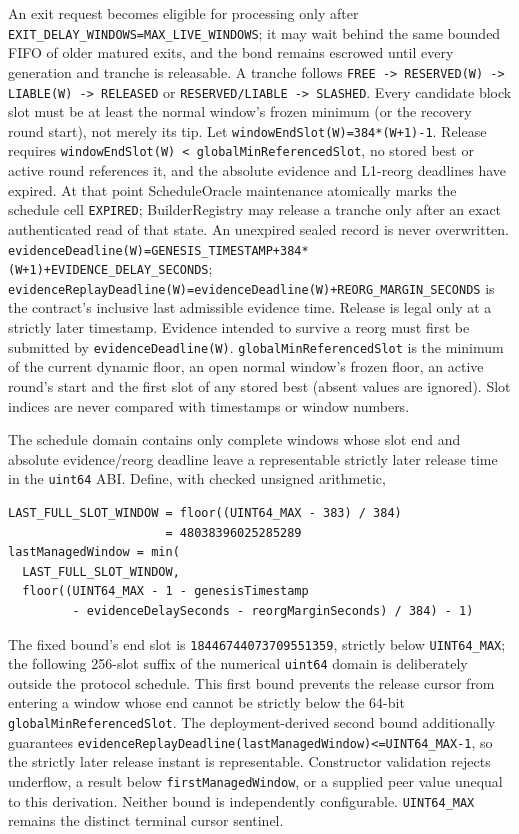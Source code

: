 \documentclass[a4paper,11pt]{article}
\newcommand{\code}[1]{\nolinkurl{#1}}
\begin{document}
An exit request becomes eligible for processing only after
\code{EXIT_DELAY_WINDOWS=MAX_LIVE_WINDOWS}; it may wait behind the same bounded
FIFO of older matured exits, and the bond remains escrowed until every generation
and tranche is releasable.  A tranche follows
\code{FREE -> RESERVED(W) -> LIABLE(W) -> RELEASED} or
\code{RESERVED/LIABLE -> SLASHED}.  Every candidate block slot must be at least
the normal window's frozen minimum (or the recovery round start), not merely its
tip.  Let \code{windowEndSlot(W)=384*(W+1)-1}.  Release requires
\code{windowEndSlot(W) < globalMinReferencedSlot}, no stored best or active round
references it, and the absolute evidence and L1-reorg deadlines have expired.
At that point ScheduleOracle maintenance atomically marks the schedule cell
\code{EXPIRED}; BuilderRegistry may release a tranche only after an exact
authenticated read of that state.  An unexpired sealed record is never
overwritten.
\code{evidenceDeadline(W)=GENESIS_TIMESTAMP+384*(W+1)+EVIDENCE_DELAY_SECONDS};
\code{evidenceReplayDeadline(W)=evidenceDeadline(W)+REORG_MARGIN_SECONDS} is
the contract's inclusive last admissible evidence time.  Release is legal only
at a strictly later timestamp.  Evidence intended to survive a reorg must first be submitted
by \code{evidenceDeadline(W)}.  \code{globalMinReferencedSlot} is the minimum of the current dynamic
floor, an open normal window's frozen floor, an active round's start and the
first slot of any stored best (absent values are ignored).  Slot indices are
never compared with timestamps or window numbers.

The schedule domain contains only complete windows whose slot end and absolute
evidence/reorg deadline leave a representable strictly later release time in
the \code{uint64} ABI.  Define, with checked unsigned arithmetic,
\begin{verbatim}
LAST_FULL_SLOT_WINDOW = floor((UINT64_MAX - 383) / 384)
                      = 48038396025285289
lastManagedWindow = min(
  LAST_FULL_SLOT_WINDOW,
  floor((UINT64_MAX - 1 - genesisTimestamp
         - evidenceDelaySeconds - reorgMarginSeconds) / 384) - 1)
\end{verbatim}
The fixed bound's end slot is \code{18446744073709551359}, strictly below
\code{UINT64_MAX}; the following 256-slot suffix of the numerical
\code{uint64} domain is deliberately outside the protocol schedule.  This
first bound prevents the release cursor from entering a window whose end cannot
be strictly below the 64-bit \code{globalMinReferencedSlot}.  The
deployment-derived second bound additionally guarantees
\code{evidenceReplayDeadline(lastManagedWindow)<=UINT64_MAX-1}, so the
strictly later release instant is representable.  Constructor validation
rejects underflow, a result below \code{firstManagedWindow}, or a supplied
peer value unequal to this derivation.  Neither bound is independently
configurable.  \code{UINT64_MAX} remains the distinct terminal cursor sentinel.
\end{document}
